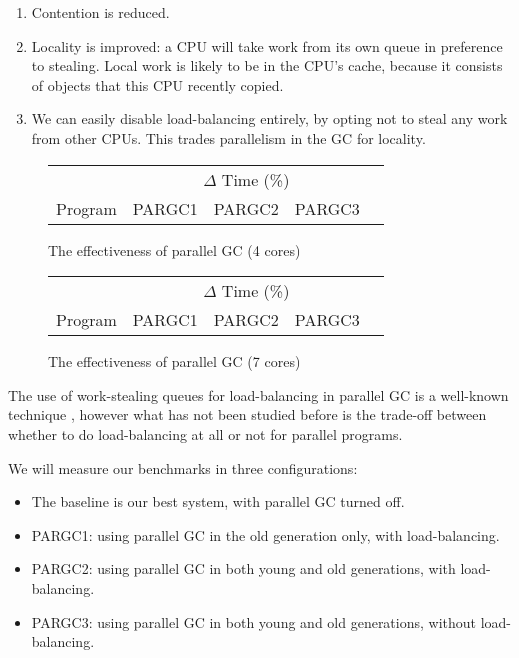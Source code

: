 \documentclass[twocolumn,9pt]{sigplanconf}
\begin{document}
\begin{enumerate}
\item Contention is reduced.
\item Locality is improved: a CPU will take work from its own queue in
  preference to stealing.  Local work is likely to be in the CPU's
  cache, because it consists of objects that this CPU recently copied.
\item We can easily disable load-balancing entirely, by opting not to
  steal any work from other CPUs.  This trades parallelism in the GC
  for locality.
\end{enumerate}

\begin{figure}
\begin{center}
\begin{tabular}{lrrrr}
\hline
        & \multicolumn{3}{c}{$\Delta$ Time (\%)} \\
Program & PARGC1 & PARGC2 & PARGC3 & \\
\hline

\hline
\end{tabular}
\caption{The effectiveness of parallel GC (4 cores)}
\label{f:parallel-gc4}
\end{center}
\end{figure}

\begin{figure}
\begin{center}
\begin{tabular}{lrrrr}
\hline
        & \multicolumn{3}{c}{$\Delta$ Time (\%)} \\
Program & PARGC1 & PARGC2 & PARGC3 & \\
\hline

\hline
\end{tabular}
\end{center}
\caption{The effectiveness of parallel GC (7 cores)}
\label{f:parallel-gc7}
\end{figure}

The use of work-stealing queues for load-balancing in parallel GC is a
well-known technique \cite{flood:parallel}, however what has not been
studied before is the trade-off between whether to do load-balancing at
all or not for parallel programs.  

We will measure our benchmarks in three configurations:

\begin{itemize}
\item The baseline is our best system, with parallel GC turned off.
\item PARGC1: using parallel GC in the old generation only, with
  load-balancing.
\item PARGC2: using parallel GC in both young and old generations, with load-balancing.
\item PARGC3: using parallel GC in both young and old generations,
  without load-balancing.
\end{itemize}
\end{document}
